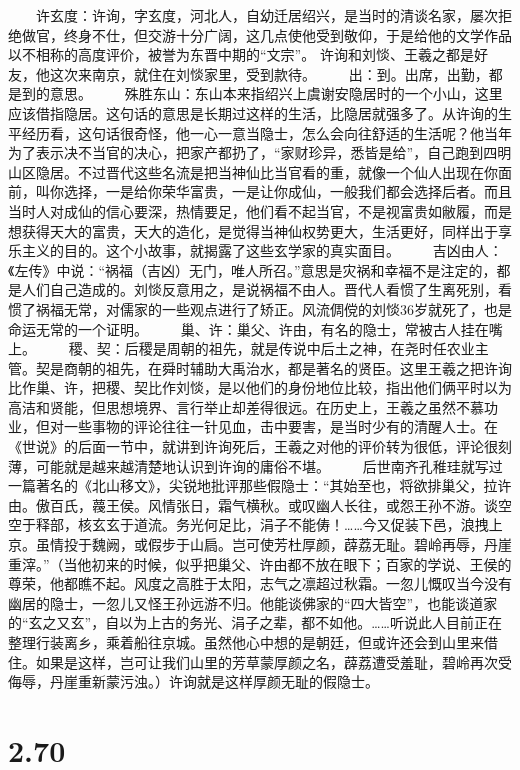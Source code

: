 \documentclass[]{book}
\begin{document}
　　许玄度：许询，字玄度，河北人，自幼迁居绍兴，是当时的清谈名家，屡次拒绝做官，终身不仕，但交游十分广阔，这几点使他受到敬仰，于是给他的文学作品以不相称的高度评价，被誉为东晋中期的``文宗''。
许询和刘惔、王羲之都是好友，他这次来南京，就住在刘惔家里，受到款待。
　　出：到。出席，出勤，都是到的意思。
　　殊胜东山：东山本来指绍兴上虞谢安隐居时的一个小山，这里应该借指隐居。这句话的意思是长期过这样的生活，比隐居就强多了。从许询的生平经历看，这句话很奇怪，他一心一意当隐士，怎么会向往舒适的生活呢？他当年为了表示决不当官的决心，把家产都扔了，``家财珍异，悉皆是给''，自己跑到四明山区隐居。不过晋代这些名流是把当神仙比当官看的重，就像一个仙人出现在你面前，叫你选择，一是给你荣华富贵，一是让你成仙，一般我们都会选择后者。而且当时人对成仙的信心要深，热情要足，他们看不起当官，不是视富贵如敝履，而是想获得天大的富贵，天大的造化，是觉得当神仙权势更大，生活更好，同样出于享乐主义的目的。这个小故事，就揭露了这些玄学家的真实面目。
　　吉凶由人：《左传》中说：``祸福（吉凶）无门，唯人所召。''意思是灾祸和幸福不是注定的，都是人们自己造成的。刘惔反意用之，是说祸福不由人。晋代人看惯了生离死别，看惯了祸福无常，对儒家的一些观点进行了矫正。风流倜傥的刘惔36岁就死了，也是命运无常的一个证明。
　　巢、许：巢父、许由，有名的隐士，常被古人挂在嘴上。
　　稷、契：后稷是周朝的祖先，就是传说中后土之神，在尧时任农业主管。契是商朝的祖先，在舜时辅助大禹治水，都是著名的贤臣。这里王羲之把许询比作巢、许，把稷、契比作刘惔，是以他们的身份地位比较，指出他们俩平时以为高洁和贤能，但思想境界、言行举止却差得很远。在历史上，王羲之虽然不慕功业，但对一些事物的评论往往一针见血，击中要害，是当时少有的清醒人士。在《世说》的后面一节中，就讲到许询死后，王羲之对他的评价转为很低，评论很刻薄，可能就是越来越清楚地认识到许询的庸俗不堪。
　　后世南齐孔稚珪就写过一篇著名的《北山移文》，尖锐地批评那些假隐士：``其始至也，将欲排巢父，拉许由。傲百氏，薎王侯。风情张日，霜气横秋。或叹幽人长往，或怨王孙不游。谈空空于释部，核玄玄于道流。务光何足比，涓子不能俦！\ldots{}\ldots{}今又促装下邑，浪拽上京。虽情投于魏阙，或假步于山扃。岂可使芳杜厚颜，薜荔无耻。碧岭再辱，丹崖重滓。''（当他初来的时候，似乎把巢父、许由都不放在眼下；百家的学说、王侯的尊荣，他都瞧不起。风度之高胜于太阳，志气之凛超过秋霜。一忽儿慨叹当今没有幽居的隐士，一忽儿又怪王孙远游不归。他能谈佛家的``四大皆空''，也能谈道家的``玄之又玄''，自以为上古的务光、涓子之辈，都不如他。\ldots{}\ldots{}听说此人目前正在整理行装离乡，乘着船往京城。虽然他心中想的是朝廷，但或许还会到山里来借住。如果是这样，岂可让我们山里的芳草蒙厚颜之名，薜荔遭受羞耻，碧岭再次受侮辱，丹崖重新蒙污浊。）许询就是这样厚颜无耻的假隐士。

\section{2.70}\label{section-116}
\end{document}

